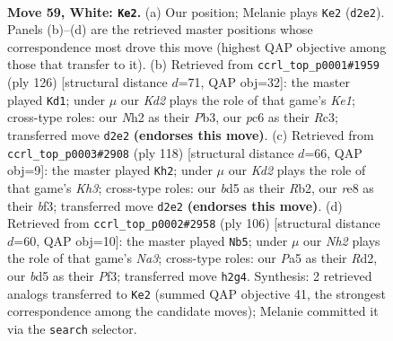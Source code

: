 \documentclass[11pt]{article}
\begin{document}
\clearpage

\begin{figure}[p]\centering
\begin{subfigure}{0.46\textwidth}\centering
\resizebox{\linewidth}{!}{%
\newchessgame
\chessboard[
  setfen={4rb2/1k4p1/p1p4r/Pp1b1p1p/2p2P1P/2B1P1P1/1P1K3N/1R4R1 w - - 19 59},
  showmover=false,
  pgfstyle=straightmove, color=movearrow, markmove={d2-e2}
]}
\caption{}
\end{subfigure}\hfill
\begin{subfigure}{0.46\textwidth}\centering
\resizebox{\linewidth}{!}{%
\newchessgame
\chessboard[
  setfen={1r6/4kp2/r2p1p2/p1p1pPb1/P1P1P2p/1PRR3P/5BP1/4K3 w - - 64 64},
  showmover=false,
  pgfstyle=straightmove, color=movearrow, markmove={e1-d1}
]}
\caption{}
\end{subfigure}
\\[4pt]
\begin{subfigure}{0.46\textwidth}\centering
\resizebox{\linewidth}{!}{%
\newchessgame
\chessboard[
  setfen={r7/5p2/1p1r1k2/1B1p3p/P1pPp2P/4PbPK/PR3P2/1R6 w - - 31 60},
  showmover=false,
  pgfstyle=straightmove, color=movearrow, markmove={h3-h2}
]}
\caption{}
\end{subfigure}\hfill
\begin{subfigure}{0.46\textwidth}\centering
\resizebox{\linewidth}{!}{%
\newchessgame
\chessboard[
  setfen={1r2n3/4bk2/2r2p2/2p1p1p1/p1K1P2p/N1B2P1P/PP1R2P1/3R4 w - - 1 54},
  showmover=false,
  pgfstyle=straightmove, color=movearrow, markmove={a3-b5}
]}
\caption{}
\end{subfigure}
\caption{\textbf{Move 59, White: \texttt{Ke2}.} (a) Our position; Melanie plays \texttt{Ke2} (\texttt{d2e2}). Panels (b)--(d) are the retrieved master positions whose correspondence most drove this move (highest QAP objective among those that transfer to it). (b) Retrieved from \texttt{ccrl\_top\_p0001\#1959} (ply 126) [structural distance $d$=71, QAP obj=32]: the master played \texttt{Kd1}; under $\mu$ our \emph{Kd2} plays the role of that game's \emph{Ke1}; cross-type roles: our \emph{N}h2 as their \emph{P}b3, our \emph{p}c6 as their \emph{R}c3; transferred move \texttt{d2e2} \textbf{(endorses this move)}. (c) Retrieved from \texttt{ccrl\_top\_p0003\#2908} (ply 118) [structural distance $d$=66, QAP obj=9]: the master played \texttt{Kh2}; under $\mu$ our \emph{Kd2} plays the role of that game's \emph{Kh3}; cross-type roles: our \emph{b}d5 as their \emph{R}b2, our \emph{r}e8 as their \emph{b}f3; transferred move \texttt{d2e2} \textbf{(endorses this move)}. (d) Retrieved from \texttt{ccrl\_top\_p0002\#2958} (ply 106) [structural distance $d$=60, QAP obj=10]: the master played \texttt{Nb5}; under $\mu$ our \emph{Nh2} plays the role of that game's \emph{Na3}; cross-type roles: our \emph{P}a5 as their \emph{R}d2, our \emph{b}d5 as their \emph{P}f3; transferred move \texttt{h2g4}. Synthesis: 2 retrieved analogs transferred to \texttt{Ke2} (summed QAP objective 41, the strongest correspondence among the candidate moves); Melanie committed it via the \texttt{search} selector.}
\label{fig:thought-m116}
\end{figure}
\end{document}
